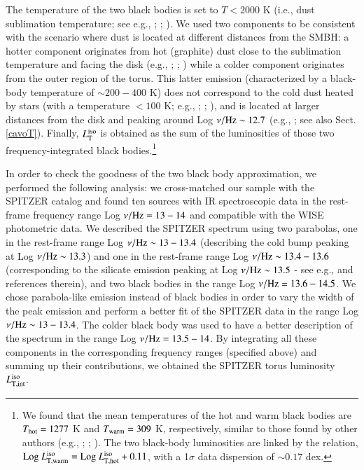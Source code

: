 \documentclass[]{aa}
\begin{document}
The temperature of the two black bodies is set to $T < 2000$ K (i.e., dust sublimation temperature; see e.g., \citealt{Hernan}; \citealt{Caldero12}; \citealt{Collinson}). We used two components to be consistent with the scenario where dust is located at different distances from the SMBH: a hotter component originates from hot (graphite) dust close to the sublimation temperature and facing the disk (e.g., \citealt{Barva}; \citealt{Galla}; \citealt{Mor}) while a colder component originates from the outer region of the torus. This latter emission (characterized by a black-body temperature of $\sim 200 - 400$ K) does not correspond to the cold dust heated by stars (with a temperature $<100$ K; e.g., \citealt{Bendo}; \citealt{Bose}; \citealt{Dale}), and is located at larger distances from the disk and peaking around Log $\nu / {\rm Hz} \sim 12.7$ (e.g., \citealt{Pear}; see also Sect. \ref{cavoT}). Finally, $L^{\rm iso}_{\rm T}$ is obtained as the sum of the luminosities of those two frequency-integrated black bodies.\footnote{We found that the mean temperatures of the hot and warm black bodies are $T_{\rm hot} = 1277$ K and $T_{\rm warm} = 309$ K, respectively, similar to those found by other authors (e.g., \citealt{Hernan}; \citealt{Caldero12}; \citealt{Collinson}). The two black-body luminosities are linked by the relation, $\text{Log}\ L^{\rm iso}_{\rm T, warm} = \text{Log}\ L^{\rm iso}_{\rm T, hot} + 0.11$, with a 1$\sigma$ data dispersion of $\sim 0.17$ dex.}

In order to check the goodness of the two black body approximation, we performed the following analysis: we cross-matched our sample with the SPITZER catalog and found ten sources with IR spectroscopic data in the rest-frame frequency range Log $\nu/ {\rm Hz} = 13 - 14$ and compatible with the WISE photometric data. We described the SPITZER spectrum using two parabolas, one in the rest-frame range Log $\nu/ {\rm Hz} \sim 13 - 13.4$ (describing the cold bump peaking at Log $\nu/ {\rm Hz} \sim 13.3$) and one in the rest-frame range Log $\nu/ {\rm Hz} \sim 13.4 - 13.6$ (corresponding to the silicate emission peaking at Log $\nu/ {\rm Hz} \sim 13.5$ - see e.g., \citealt{HonKish} and references therein), and two black bodies in the range Log $\nu/ {\rm Hz} = 13.6 - 14.5$. We chose parabola-like emission instead of black bodies in order to vary the width of the peak emission and perform a better fit of the SPITZER data in the range Log $\nu/ {\rm Hz} \sim 13 - 13.4$. The colder black body was used to have a better description of the spectrum in the range Log $\nu/ {\rm Hz} = 13.5 - 14$. By integrating all these components in the corresponding frequency ranges (specified above) and summing up their contributions, we obtained the SPITZER torus luminosity $L^{\rm iso}_{\rm T,int}$.
\end{document}
